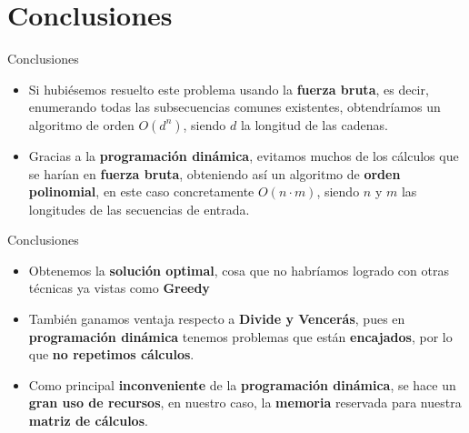 \documentclass[10pt, xcolor=table]{beamer}
\begin{document}
\section{Conclusiones}
\begin{frame}[fragile]{Conclusiones}
	\begin{itemize}
		\item Si hubiésemos resuelto este problema usando la \textbf{fuerza bruta}, es decir, enumerando todas las subsecuencias comunes existentes, obtendríamos un algoritmo de orden $O(d^n)$, siendo $d$ la longitud de las cadenas.
		\item Gracias a la \textbf{programación dinámica}, evitamos muchos de los cálculos que se harían en \textbf{fuerza bruta}, obteniendo así un algoritmo de \textbf{orden polinomial}, en este caso concretamente $O(n \cdot m)$, siendo $n$ y $m$ las longitudes de las secuencias de entrada.
	\end{itemize}
\end{frame}

\begin{frame}[fragile]{Conclusiones}
	\begin{itemize}
		\item Obtenemos la \textbf{solución optimal}, cosa que no habríamos logrado con otras técnicas ya vistas como \textbf{Greedy}
	\item También ganamos ventaja respecto a \textbf{Divide y Vencerás}, pues en \textbf{programación dinámica} tenemos problemas que están \textbf{encajados}, por lo que \textbf{no repetimos cálculos}.
	\item Como principal \textbf{inconveniente} de la \textbf{programación dinámica}, se hace un \textbf{gran uso de recursos}, en nuestro caso, la \textbf{memoria} reservada para nuestra \textbf{matriz de cálculos}.
	\end{itemize}
\end{frame}
\end{document}
